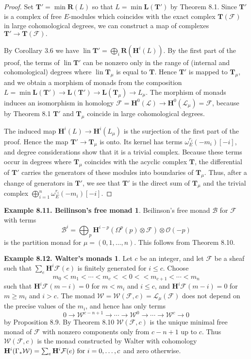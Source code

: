 \documentclass{tran-l}
\newcommand{\tensor}{\otimes}
\newcommand{\lin}{\operatorname{lin}}
\newcommand{\myB}{\mathcal{B}}
\newcommand{\F}{\mathcal{F}}
\newcommand{\myH}{\mathbf{H}}
\newcommand{\LL}{\mathbf{L}}
\newcommand{\RR}{\mathbf{R}}
\newcommand{\TT}{\mathbf{T}}
\newcommand{\W}{\mathcal{W}}
\theoremstyle{plain}
\theoremstyle{remark}
\theoremstyle{definition}
\newtheorem*{definition11}{Example 8.11. Beilinson's free monad}
\newtheorem*{definition12}{Example 8.12. Walter's monads}
\begin{document}
\begin{proof}
Set $\TT '=\min \RR (L)$ so that $L= \min \LL (\TT ')$
by Theorem 8.1.
Since $\TT '$ is a complex of free $E$-modules which coincides with the
exact complex $\TT (\F )$
in large cohomological degrees, we can construct a map of complexes
$ \TT ' \to \TT (\F ).$

By Corollary 3.6 we have
$\lin \TT ' = \bigoplus _{i} \RR (\myH ^{i} (L)).$
By the first part of the proof, the terms of 
$\lin \TT ' $ can be nonzero only in the
range of (internal and cohomological) degrees where $\lin \TT _{\mu }$
is equal to $\TT $.
Hence $\TT '$ is mapped to $\TT _{\mu }$,
and we obtain a morphism of monads from the composition
$L = \min \LL (\TT ') \to \LL (\TT ') \to \LL (\TT _{\mu })
\to L_{\mu }$.
The morphism of monads induces an isomorphism in homology
$\F =\myH ^{0}(\mathcal{L}) \to \myH ^{0}(\mathcal{L}_{\mu })=\F $,
because by Theorem 8.1 $\TT '$ and $\TT _{\mu }$ coincide in large
cohomological degrees.

The induced map
$\myH ^{i}(L) \to \myH ^{i}(L_{\mu })$ 
is the surjection of the first part of the proof. Hence the
map  $\TT '\to \TT _{\mu }$ is onto. Its kernel has terms
$\omega _{E}^{r_{i}}(-m_{i})[-i]$, and degree considerations show that
it is a trivial complex. Because these terms occur
in degrees where $\TT _{\mu }$ coincides with the acyclic complex $\TT $,
the differential of $\TT '$ carries
the generators of these modules into boundaries of $\TT _{\mu }$.
Thus, after a change of generators in $\TT '$, we see that 
$\TT '$ is the direct sum of $\TT _{\mu }$ and the trivial
complex $\bigoplus _{i=1}^{n}\omega _{E}^{r_{i}}(-m_{i})[-i]$.\end{proof}
\begin{definition11}
Beilinson's free monad $\myB $ for $\F $ with terms
\begin{equation*}\myB ^{i} = \bigoplus _{p} \myH ^{i-p}(\Omega ^{p}(p) \tensor \F
) \tensor \mathcal{O} (-p)\end{equation*}
is the partition monad for
$\mu = (0,1,\ldots , n)$. This follows from 
Theorem 8.10.
\end{definition11}
\begin{definition12}
Let $c$ be an integer,
and let $\F $ be a  sheaf such that $\sum _{e} \myH ^{i}\F (e)$ is finitely
generated for $i \le c$. Choose
\begin{equation*}m_{0}<m_{1}< \cdots < m_{c} << 0 << m_{c+1} < \cdots < m_{n}\end{equation*}
such that $\myH ^{i} \F (m-i)=0$ for $m < m_{i}$ and $i \le c$, and $\myH ^{i}\F (m-i)=0$ for $m\ge m_{i}$ and
$i> c$.
The monad $\W =\W (\F ,c)=\mathcal{L}_{\mu }(\F )$ does not depend on the precise
values of the $m_{i}$, and hence has only  terms
\begin{equation*}0 \to \W ^{c-n+1} \to \cdots \to \W ^{0} \to \cdots \to \W ^{c} \to 0\end{equation*}
by 
Proposition 8.9. 
 By 
Theorem 8.10 $\W (\F ,c)$ is the unique minimal free
monad of $\F $ with nonzero components only from $c-n+1$ up to $c$.
Thus $\W (\F ,c)$ is the monad constructed by 
Walter \cite{Wal} with cohomology
$\myH ^{i}(\Gamma _{*}\W )= \sum _{e} \myH ^{i}\F (e) \hbox { for } i=0,\ldots ,c$
and zero otherwise.
\end{definition12}
\end{document}
